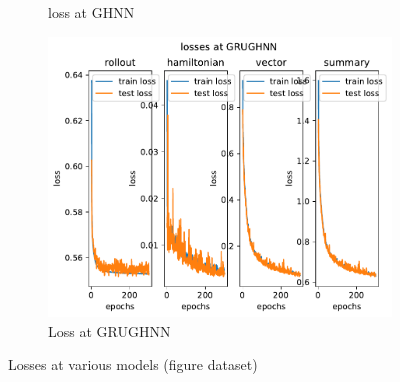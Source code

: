 \begin{figure}[H]
\begin{subfigure}[b]{0.3\textwidth}
		\caption{loss at GHNN}
	\end{subfigure}
	\hfill
	\begin{subfigure}[b]{0.3\textwidth}
		\centering
		\includegraphics[width=\textwidth]{chapters/chapter5/fig_grughnn_loss.pdf}
		\caption{Loss at GRUGHNN}
	\end{subfigure}
	
	\caption{Losses at various models (figure dataset)}
	\label{fig_loss}
\end{figure}

